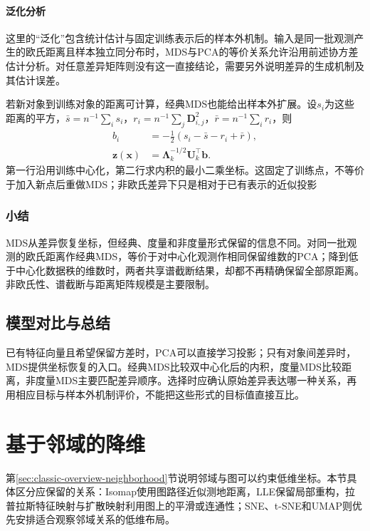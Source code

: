 \paragraph{泛化分析}

这里的“泛化”包含统计估计与固定训练表示后的样本外机制。输入是同一批观测产生的欧氏距离且样本独立同分布时，MDS与PCA的等价关系允许沿用前述协方差估计分析。对任意差异矩阵则没有这一直接结论，需要另外说明差异的生成机制及其估计误差。

若新对象到训练对象的距离可计算，经典MDS也能给出样本外扩展。设$s_i$为这些距离的平方，$\bar s=n^{-1}\sum_i s_i$，$r_i=n^{-1}\sum_j\bm{D}_{i,j}^2$，$\bar r=n^{-1}\sum_i r_i$，则
\begin{equation}
  \label{eq:dim-mds-extension}
  \begin{aligned}
    b_i&=-\frac12(s_i-\bar s-r_i+\bar r),\\
    \bm{z}(\bm{x})
      &=\bm{\Lambda}_k^{-1/2}\bm{U}_k^{\top}\bm{b}.
  \end{aligned}
\end{equation}
第一行沿用训练中心化，第二行求内积的最小二乘坐标。这固定了训练点，不等价于加入新点后重做MDS；非欧氏差异下只是相对于已有表示的近似投影

\subsubsection{小结}

MDS从差异恢复坐标，但经典、度量和非度量形式保留的信息不同。对同一批观测的欧氏距离作经典MDS，等价于对中心化观测作相同保留维数的PCA；降到低于中心化数据秩的维数时，两者共享谱截断结果，却都不再精确保留全部原距离。非欧氏性、谱截断与距离矩阵规模是主要限制。

\subsection{模型对比与总结}

已有特征向量且希望保留方差时，PCA可以直接学习投影；只有对象间差异时，MDS提供坐标恢复的入口。经典MDS比较双中心化后的内积，度量MDS比较距离，非度量MDS主要匹配差异顺序。选择时应确认原始差异表达哪一种关系，再用相应目标与样本外机制评价，不能把这些形式的目标值直接互比。

\section{基于邻域的降维}
\label{sec:dim-neighbors}
\label{sec:dim-manifold}

第\ref{sec:classic-overview-neighborhood}节说明邻域与图可以约束低维坐标。本节具体区分应保留的关系：Isomap使用图路径近似测地距离，LLE保留局部重构，拉普拉斯特征映射与扩散映射利用图上的平滑或连通性；SNE、t-SNE和UMAP则优先安排适合观察邻域关系的低维布局。

